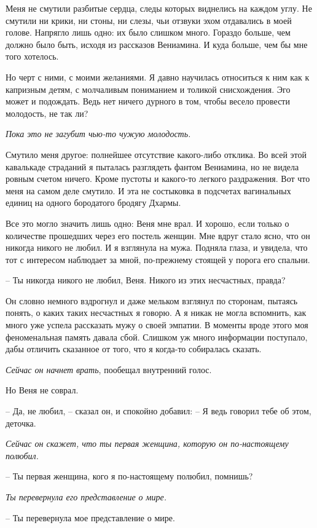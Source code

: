 \documentclass[
]{book}
\begin{document}
Меня не смутили разбитые сердца, следы которых виднелись на каждом углу. Не смутили ни крики, ни стоны, ни слезы, чьи отзвуки эхом отдавались в моей голове. Напрягло лишь одно: их было слишком много. Гораздо больше, чем должно было быть, исходя из рассказов Вениамина. И куда больше, чем бы мне того хотелось.

Но черт с ними, с моими желаниями. Я давно научилась относиться к ним как к капризным детям, с молчаливым пониманием и толикой снисхождения. Эго может и подождать. Ведь нет ничего дурного в том, чтобы весело провести молодость, не так ли?

\emph{Пока это не загубит чью-то чужую молодость.}

Смутило меня другое: полнейшее отсутствие какого-либо отклика. Во всей этой кавалькаде страданий я пыталась разглядеть фантом Вениамина, но не видела ровным счетом ничего. Кроме пустоты и какого-то легкого раздражения. Вот что меня на самом деле смутило. И эта не состыковка в подсчетах вагинальных единиц на одного бородатого бродягу Дхармы.

Все это могло значить лишь одно: Веня мне врал. И хорошо, если только о количестве прошедших через его постель женщин. Мне вдруг стало ясно, что он никогда никого не любил. И я взглянула на мужа. Подняла глаза, и увидела, что тот с интересом наблюдает за мной, по-прежнему стоящей у порога его спальни.

-- Ты никогда никого не любил, Веня. Никого из этих несчастных, правда?

Он словно немного вздрогнул и даже мельком взглянул по сторонам, пытаясь понять, о каких таких несчастных я говорю. А я никак не могла вспомнить, как много уже успела рассказать мужу о своей эмпатии. В моменты вроде этого моя феноменальная память давала сбой. Слишком уж много информации поступало, дабы отличить сказанное от того, что я когда-то собиралась сказать.

\emph{Сейчас он начнет врать}, пообещал внутренний голос.

Но Веня не соврал.

-- Да, не любил, -- сказал он, и спокойно добавил: -- Я ведь говорил тебе об этом, деточка.

\emph{Сейчас он скажет, что ты первая женщина, которую он по-настоящему полюбил.}

-- Ты первая женщина, кого я по-настоящему полюбил, помнишь?

\emph{Ты перевернула его представление о мире.}

-- Ты перевернула мое представление о мире.
\end{document}
